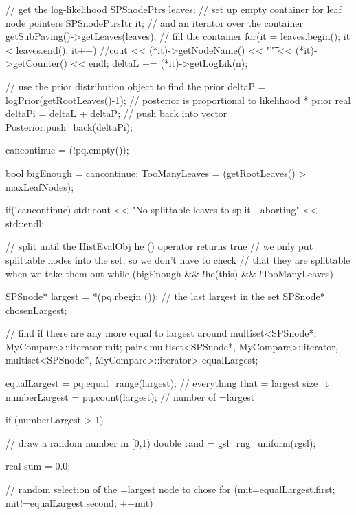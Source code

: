 \begin{DoxyCode}
{{      // get the log-likelihood
      SPSnodePtrs leaves; // set up empty container for leaf node pointers
      SPSnodePtrsItr it; // and an iterator over the container
      getSubPaving()->getLeaves(leaves); // fill the container
        for(it = leaves.begin(); it < leaves.end(); it++) {
        //cout << (*it)->getNodeName() << "\t" << (*it)->getCounter() << endl; 
        deltaL += (*it)->getLogLik(n);
      }

      // use the prior distribution object to find the prior 
      deltaP = logPrior(getRootLeaves()-1);
      // posterior is proportional to likelihood * prior
      real deltaPi = deltaL + deltaP;
      // push back into vector
      Posterior.push_back(deltaPi);

      cancontinue = (!pq.empty());
        
        bool bigEnough = cancontinue;
        TooManyLeaves = (getRootLeaves() > maxLeafNodes);

        if(!cancontinue) {
            std::cout << "No splittable leaves to split - aborting" << 
      std::endl;
        }

        // split until the HistEvalObj he () operator returns true
        // we only put splittable nodes into the set, so we don't have to check
        // that they are splittable when we take them out
        while (bigEnough && !he(this) && !TooManyLeaves) {
            
            SPSnode* largest = *(pq.rbegin ()); // the last largest in the set
            SPSnode* chosenLargest;
            
            // find if there are any more equal to largest around
            multiset<SPSnode*, MyCompare>::iterator mit;
            pair<multiset<SPSnode*, MyCompare>::iterator,
                multiset<SPSnode*, MyCompare>::iterator> equalLargest;

            equalLargest = pq.equal_range(largest); // everything that =
       largest
            size_t numberLargest = pq.count(largest); // number of =largest

            if (numberLargest > 1) {

                // draw a random number in [0,1)
                double rand = gsl_rng_uniform(rgsl);

                real sum = 0.0;

                // random selection of the =largest node to chose
                for (mit=equalLargest.first; mit!=equalLargest.second; ++mit) {

}}}}}
\end{DoxyCode}
